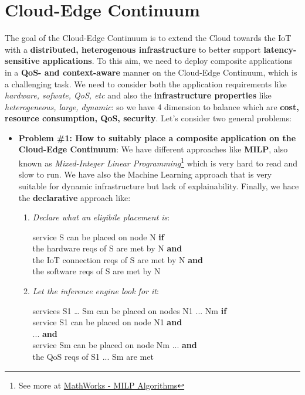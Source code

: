 \documentclass[10pt,a4paper]{report}
\begin{document}
\section{Cloud-Edge Continuum}
The goal of the Cloud-Edge Continuum is to extend the Cloud towards the IoT with a \textbf{distributed, heterogenous infrastructure} to better support \textbf{latency-sensitive applications}. To this aim, we need to deploy composite applications in a \textbf{QoS- and context-aware} manner on the Cloud-Edge Continuum, which is a challenging task. We need to consider both the application requirements like \textit{hardware, sofwate, QoS, etc} and also the \textbf{infrastructure properties} like \textit{heterogeneous, large, dynamic}: so we have 4 dimension to balance which are \textbf{cost, resource consumption, QoS, security}. Let's consider two general problems:
\begin{itemize}
	\item \textbf{Problem \#1: How to suitably place a composite
	application on the Cloud-Edge Continuum}: We have different approaches like \textbf{MILP}, also known as \textit{Mixed-Integer Linear Programming}\footnote{See more at \href{https://it.mathworks.com/help/optim/ug/mixed-integer-linear-programming-algorithms.html}{MathWorks - MILP Algorithms}} which is very hard to read and slow to run. We have also the Machine Learning approach that is very suitable for dynamic infrastructure but lack of explainability. Finally, we hace the \textbf{declarative} approach like:
	\begin{enumerate}
		\item \textit{Declare what an eligibile placement is}:
		\begin{center}
			service S can be placed on node N \textbf{if} \\
			the hardware reqs of S are met by N \textbf{and} \\
			the IoT connection reqs of S are met by N \textbf{and} \\
			the software reqs of S are met by N 
		\end{center}
		
		\item \textit{Let the inference engine look for it}:
		\begin{center}
			services S1 … Sm can be placed on nodes N1 ... Nm \textbf{if}\\
			service S1 can be placed on node N1 \textbf{and} \\
			... \textbf{and} \\
			service Sm can be placed on node Nm ... \textbf{and} \\
			the QoS reqs of S1 ... Sm are met 
		\end{center}
	\end{enumerate}


\end{itemize}
\end{document}
